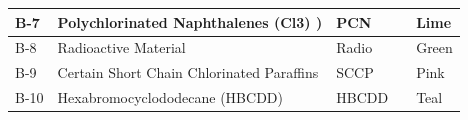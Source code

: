 \documentclass{article}
\begin{document}
\begin{center}
\begin{table}[H]
\begin{tabular}{|ll|l|ll|}
\multicolumn{1}{|l|}{B-7}    &  Polychlorinated Naphthalenes (Cl3) )                                 &         PCN    &           \multicolumn{1}{l|}{\cellcolor[HTML]{DEF518}} & Lime      \\ \hline
\multicolumn{1}{|l|}{B-8 }    &  Radioactive Material                                 &         Radio    &           \multicolumn{1}{l|}{\cellcolor[HTML]{6DF518}} & Green      \\ \hline
\multicolumn{1}{|l|}{B-9}    &  Certain Short Chain Chlorinated Paraffins                                 &         SCCP    &           \multicolumn{1}{l|}{\cellcolor[HTML]{F518D4}} & Pink      \\ \hline
\multicolumn{1}{|l|}{B-10}    &  Hexabromocyclododecane (HBCDD)                                 &         HBCDD    &           \multicolumn{1}{l|}{\cellcolor[HTML]{0B421B}} & Teal      \\ \hline
\end{tabular}
\end{table}
\end{center}
\end{document}
